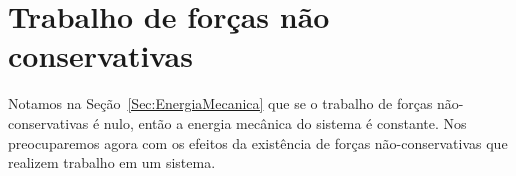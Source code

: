 


\pagebreak
\section{Trabalho de forças não conservativas}
\label{Sec:TrabalhoForcasNaoConservativas}

Notamos na Seção~\ref{Sec:EnergiaMecanica} que se o trabalho de forças não-conservativas é nulo, então a energia mecânica do sistema é constante. Nos preocuparemos agora com os efeitos da existência de forças não-conservativas que realizem trabalho em um sistema.

